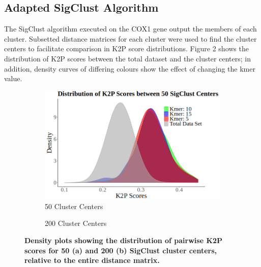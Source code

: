 \documentclass[12pt]{article}
\begin{document}
  \subsection{Adapted SigClust Algorithm}

  The SigClust algorithm executed on the COX1 gene output the members of each cluster. Subsetted distance matrices for each cluster were used to find the cluster centers to facilitate comparison in K2P score distributions. Figure 2 shows the distribution of K2P scores between the total dataset and the cluster centers; in addition, density curves of differing colours show the effect of changing the kmer value.

  \begin{figure}[H]
    \centering
    \begin{subfigure}{0.496\textwidth}
        \includegraphics[width=\linewidth]{sigClust_50.png}
        \caption{50 Cluster Centers}
    \end{subfigure}%
    \hspace{-0.2cm} 
    \begin{subfigure}{0.5\textwidth}
        \caption{200 Cluster Centers}
    \end{subfigure}
    \captionsetup{margin=0.75cm}
      \caption{\textbf{\small Density plots showing the distribution of pairwise K2P scores for 50 (a) and 200 (b) SigClust cluster centers, relative to the entire distance matrix.}}
  \end{figure}
\end{document}

